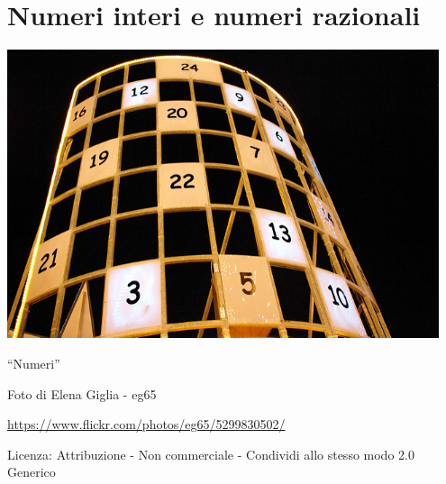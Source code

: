\part{Numeri interi e numeri razionali}

\includegraphics[width=0.95\textwidth]{img/numeri.jpg}
  \begin{center}
    {\large ``Numeri''}\par
    Foto di Elena Giglia - eg65\par
    \url{https://www.flickr.com/photos/eg65/5299830502/}\par
    Licenza: Attribuzione - Non commerciale - Condividi allo stesso modo 2.0 Generico\par
  \end{center}
\clearpage
\cleardoublepage
